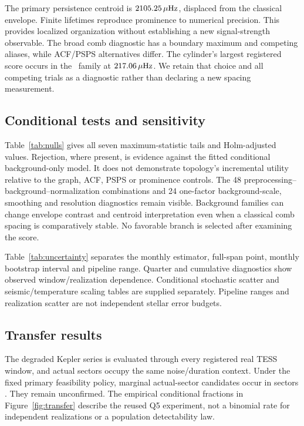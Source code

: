 \documentclass[11pt]{article}
\begin{document}
The primary persistence centroid is $2105.25\,\mu{\rm Hz}$, displaced
from the classical envelope. Finite lifetimes reproduce prominence to numerical
precision. This provides localized organization without establishing a new
signal-strength observable. The broad comb diagnostic has a boundary maximum
and competing aliases, while ACF/PSPS alternatives differ. The cylinder's
largest registered score occurs in the \RudyAlias\ family at
$217.06\,\mu{\rm Hz}$. We retain that choice and all competing trials
as a diagnostic rather than declaring a new spacing measurement.

\subsection{Conditional tests and sensitivity}
Table~\ref{tab:nulls} gives all seven maximum-statistic tails and Holm-adjusted
values. Rejection, where present, is evidence against the fitted conditional
background-only model. It does not demonstrate topology's incremental utility
relative to the graph, ACF, PSPS or prominence controls.
The 48 preprocessing--background--normalization combinations and 24 one-factor
background-scale, smoothing and resolution diagnostics remain visible.
Background families can change envelope contrast and centroid interpretation
even when a classical comb spacing is comparatively stable. No favorable branch
is selected after examining the score.

Table~\ref{tab:uncertainty} separates the monthly estimator, full-span point,
monthly bootstrap interval and pipeline range. Quarter and cumulative diagnostics
show observed window/realization dependence. Conditional stochastic scatter and
seismic/temperature scaling tables are supplied separately. Pipeline ranges and
realization scatter are not independent stellar error budgets.

\subsection{Transfer results}
The degraded Kepler series is evaluated through every registered real TESS
window, and actual sectors occupy the same noise/duration context. Under the
fixed primary feasibility policy, marginal actual-sector candidates occur in
sectors \TessCandidateSectors. They remain unconfirmed. The empirical conditional
fractions in Figure~\ref{fig:transfer} describe the reused Q5 experiment, not a
binomial rate for independent realizations or a population detectability law.
\end{document}
